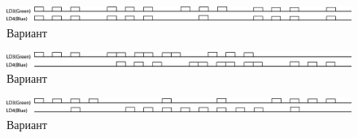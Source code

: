 \begin{figure}[H]
\begin{center}
\includegraphics[scale=0.3]{Image/85.jpg} 
\end{center}
\caption{Вариант }
\end{figure}
\begin{figure}[H]
\begin{center}
\includegraphics[scale=0.3]{Image/86.jpg} 
\end{center}
\caption{Вариант }
\end{figure}
\begin{figure}[H]
\begin{center}
\includegraphics[scale=0.3]{Image/87.jpg} 
\end{center}
\caption{Вариант }
\end{figure}
